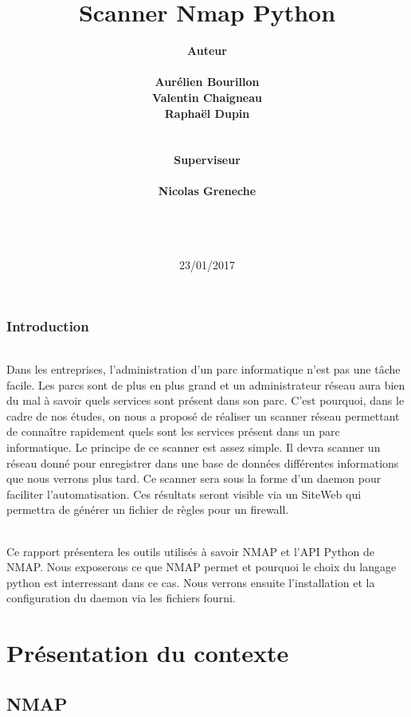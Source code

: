 \documentclass[12pt]{report}
\title{Scanner Nmap Python}
\author {\bf Auteur\\\\
		Aurélien Bourillon\\
		Valentin Chaigneau\\
		Raphaël Dupin\\\\\\
		\bf Superviseur\\\\
		Nicolas Greneche\\\\\\\\}
\date{23/01/2017}
\begin{document}
\maketitle
\section*{Introduction}
	\paragraph{}
	Dans les entreprises, l'administration d'un parc informatique n'est pas une tâche facile. Les parcs sont de plus en plus grand et un administrateur réseau aura bien du mal à savoir quels services sont présent dans son parc. C'est pourquoi, dans le cadre de nos études, on nous a proposé de réaliser un scanner réseau permettant de connaître rapidement quels sont les services présent dans un parc informatique.	Le principe de ce scanner est assez simple. Il devra scanner un réseau donné pour enregistrer dans une base de données différentes informations que nous verrons plus tard. Ce scanner sera sous la forme d'un daemon pour faciliter l'automatisation. Ces résultats seront visible via un SiteWeb qui permettra de générer un fichier de règles pour un firewall.
	\paragraph{}
	Ce rapport présentera les outils utilisés à savoir NMAP et l'API Python de NMAP. Nous exposerons ce que NMAP permet et pourquoi le choix du langage python est interressant dans ce cas. Nous verrons ensuite l'installation et la configuration du daemon via les fichiers fourni. 
\tableofcontents
\part{Présentation du contexte}
	\chapter{NMAP}
\end{document}
